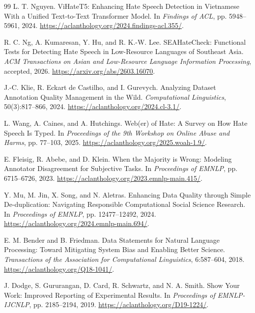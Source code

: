 \documentclass[11pt]{article}
\begin{document}
\begin{thebibliography}{99}
L. T. Nguyen.
ViHateT5: Enhancing Hate Speech Detection in Vietnamese With a Unified Text-to-Text Transformer Model.
In \emph{Findings of ACL}, pp. 5948--5961, 2024.
\url{https://aclanthology.org/2024.findings-acl.355/}.

R. C. Ng, A. Kumaresan, Y. Hu, and R. K.-W. Lee.
SEAHateCheck: Functional Tests for Detecting Hate Speech in Low-Resource Languages of Southeast Asia.
\emph{ACM Transactions on Asian and Low-Resource Language Information Processing}, accepted, 2026.
\url{https://arxiv.org/abs/2603.16070}.

J.-C. Klie, R. Eckart de Castilho, and I. Gurevych.
Analyzing Dataset Annotation Quality Management in the Wild.
\emph{Computational Linguistics}, 50(3):817--866, 2024.
\url{https://aclanthology.org/2024.cl-3.1/}.

L. Wang, A. Caines, and A. Hutchings.
Web(er) of Hate: A Survey on How Hate Speech Is Typed.
In \emph{Proceedings of the 9th Workshop on Online Abuse and Harms}, pp. 77--103, 2025.
\url{https://aclanthology.org/2025.woah-1.9/}.

E. Fleisig, R. Abebe, and D. Klein.
When the Majority is Wrong: Modeling Annotator Disagreement for Subjective Tasks.
In \emph{Proceedings of EMNLP}, pp. 6715--6726, 2023.
\url{https://aclanthology.org/2023.emnlp-main.415/}.

Y. Mu, M. Jin, X. Song, and N. Aletras.
Enhancing Data Quality through Simple De-duplication: Navigating Responsible Computational Social Science Research.
In \emph{Proceedings of EMNLP}, pp. 12477--12492, 2024.
\url{https://aclanthology.org/2024.emnlp-main.694/}.

E. M. Bender and B. Friedman.
Data Statements for Natural Language Processing: Toward Mitigating System Bias and Enabling Better Science.
\emph{Transactions of the Association for Computational Linguistics}, 6:587--604, 2018.
\url{https://aclanthology.org/Q18-1041/}.

J. Dodge, S. Gururangan, D. Card, R. Schwartz, and N. A. Smith.
Show Your Work: Improved Reporting of Experimental Results.
In \emph{Proceedings of EMNLP-IJCNLP}, pp. 2185--2194, 2019.
\url{https://aclanthology.org/D19-1224/}.

\end{thebibliography}
\end{document}

